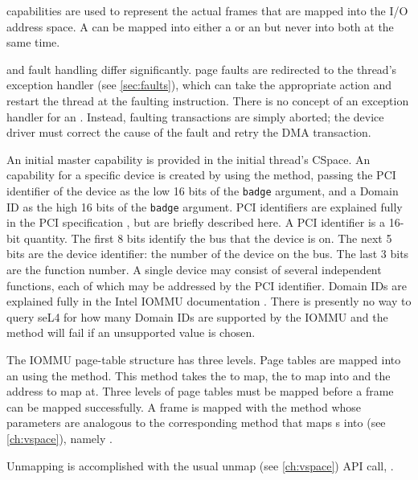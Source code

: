  capabilities are used to represent the actual frames that are
mapped into the I/O address space. A  can be mapped into
either a  or an  but never into both at the same time.

 and  fault handling differ significantly.
 page faults are redirected to the thread's exception handler (see \autoref{sec:faults}),
which can take the
appropriate action and restart the thread at the faulting instruction.
There is no concept of an exception handler for an . Instead, faulting
transactions are simply
aborted; the device driver must correct the cause of the fault and retry
the DMA transaction.

An initial master  capability is provided in the initial thread's
CSpace. An  capability for a specific device is created by
using the  method, passing the
PCI identifier of the device as the low 16 bits of the \texttt{badge} argument, and
a Domain ID as the high 16 bits of the \texttt{badge} argument.
PCI identifiers are explained fully in the PCI specification
\cite{Shanley:PCISA}, but are briefly described here. A PCI identifier is
a 16-bit quantity.  The first 8 bits identify the bus that the device is on.
The next 5 bits are the device identifier: the number of the device on
the bus. The last 3 bits are the function number. A single device may
consist of several independent functions, each of which may be addressed
by the PCI identifier.
Domain IDs are explained fully in the Intel IOMMU documentation \cite{extra:vtd}.
There is presently no way to query seL4 for how many Domain IDs are supported by
the IOMMU and the  method will fail if an
unsupported value is chosen.

The IOMMU page-table structure has three levels.
Page tables are mapped into an  using the  method.
This method takes the  to map, the  to map into
and the address to map at. Three levels of page tables must be mapped before
a frame can be mapped successfully. A frame is mapped with the
 method whose parameters are analogous to
the corresponding method that maps s into  (see \autoref{ch:vspace}),
namely .

Unmapping is accomplished with the usual unmap (see \autoref{ch:vspace}) API
call,
.

